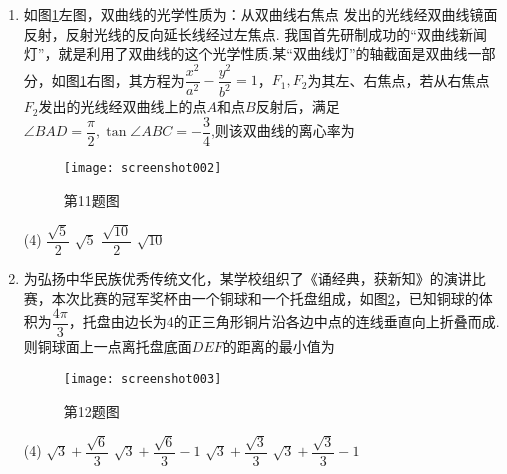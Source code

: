 \documentclass[11pt]{article}
\begin{document}
\begin{enumerate}
	\item 如图\ref{fig:screenshot002}左图，双曲线的光学性质为：从双曲线右焦点 发出的光线经双曲线镜面反射，反射光线的反向延长线经过左焦点. 我国首先研制成功的“双曲线新闻灯”，就是利用了双曲线的这个光学性质.某“双曲线灯”的轴截面是双曲线一部分，如图\ref{fig:screenshot002}右图，其方程为$ \dfrac{x^2}{a^2}-\dfrac{y^2}{b^2}=1 $，$ F_1,F_2 $为其左、右焦点，若从右焦点$ F_2 $发出的光线经双曲线上的点$ A $和点$ B $反射后，满足$ \angle BAD=\dfrac{\pi}{2} ,\tan \angle ABC=-\dfrac{3}{4} $,则该双曲线的离心率为
	\begin{figure}[htbp]
		\centering
		\texttt{[image: screenshot002]}
		\caption{\heiti 第11题图}
		\label{fig:screenshot002}
	\end{figure}
	\begin{tasks}(4)
		\task $ \dfrac{\sqrt{5}}{2} $
		\task $ \sqrt{5} $
		\task $ \dfrac{\sqrt{10}}{2} $
		\task $ \sqrt{10} $
	\end{tasks}

	\item 为弘扬中华民族优秀传统文化，某学校组织了《诵经典，获新知》的演讲比赛，本次比赛的冠军奖杯由一个铜球和一个托盘组成，如图\ref{fig:screenshot003}，已知铜球的体积为$ \dfrac{4\pi}{3} $，托盘由边长为4的正三角形铜片沿各边中点的连线垂直向上折叠而成. 则铜球面上一点离托盘底面$ DEF $的距离的最小值为
	\begin{figure}[htbp]
		\centering
		\texttt{[image: screenshot003]}
		\caption{\heiti 第12题图}
		\label{fig:screenshot003}
	\end{figure}
	\begin{tasks}(4)
		\task $ \sqrt{3}+\dfrac{\sqrt{6}}{3} $
		\task $ \sqrt{3}+\dfrac{\sqrt{6}}{3}-1 $
		\task $ \sqrt{3}+\dfrac{\sqrt{3}}{3} $
		\task $ \sqrt{3}+\dfrac{\sqrt{3}}{3}-1 $
	\end{tasks}
\end{enumerate}
\end{document}
